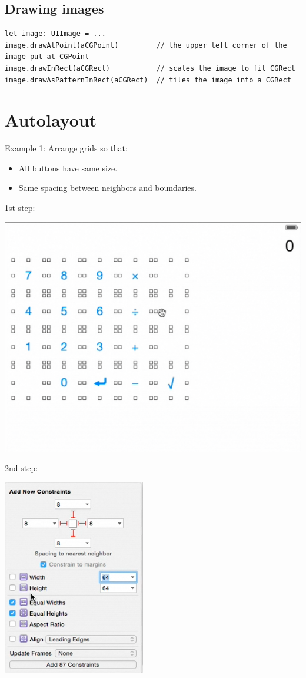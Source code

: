 \documentclass[12pt]{report}
\begin{document}
\section{Drawing images}
\begin{lstlisting}
let image: UIImage = ...
image.drawAtPoint(aCGPoint)			// the upper left corner of the image put at CGPoint
image.drawInRect(aCGRect)			// scales the image to fit CGRect
image.drawAsPatternInRect(aCGRect)	// tiles the image into a CGRect
\end{lstlisting}


\chapter{Autolayout}
Example 1: Arrange grids so that:
\begin{itemize}
	\item All buttons have same size.
	\item Same spacing between neighbors and boundaries.
\end{itemize}
1st step:
\begin{center} \includegraphics[scale = 0.5]{autolayout1.png} \end{center}
2nd step:
\begin{center} \includegraphics[scale = 0.5]{autolayout1_1.png} \end{center}
\end{document}
